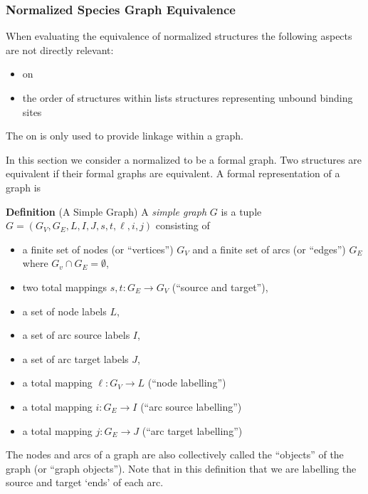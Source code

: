 \documentclass{cekarticle}
\begin{document}
\subsubsection{Normalized Species Graph Equivalence}
\label{sec:match-graphs}

When evaluating the equivalence of normalized 
structures the following aspects are not directly relevant:
\begin{itemize}
\item {} on 

\item the order of structures within lists 
structures representing unbound binding sites
\end{itemize}

The  on  is only used to
provide linkage within a graph.

In this section we consider a normalized  to
be a formal graph. Two  structures are
equivalent if their formal graphs are equivalent. A formal
representation of a graph is

\textbf{Definition} (A Simple Graph) A \emph{simple graph} $G$ is a
tuple $G = (G_{V}, G_{E}, L, I, J, s, t, \ell, i, j)$
consisting of
\begin{itemize}

\item a finite set of nodes (or ``vertices'') $G_{V}$ and a finite set of arcs (or ``edges'') $G_{E}$
        where $G_{v} \cap G_{E} = \emptyset$,

\item two total mappings $s, t : G_{E} \rightarrow G_{V}$ (``source and target''),

\item a set of node labels $L$,

\item a set of arc source labels $I$,

\item a set of arc target labels $J$,

\item a total mapping $\ell : G_{V} \rightarrow L$ (``node labelling'')

\item a total mapping $i : G_{E} \rightarrow I$ (``arc source labelling'')

\item a total mapping $j : G_{E} \rightarrow J$ (``arc target labelling'')

\end{itemize}
The nodes and arcs of a graph are also collectively called the
``objects'' of the graph (or ``graph objects'').  Note that in
this definition that we are labelling the source and target `ends'
of each arc.
\end{document}
